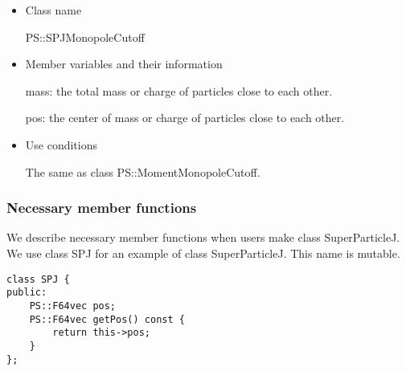 \begin{itemize}
\item Class name

  PS::SPJMonopoleCutoff

\item Member variables and their information

  mass: the total mass or charge of particles close to each other.

  pos: the center of mass or charge of particles close to each other.

\item Use conditions

  The same as class PS::MomentMonopoleCutoff.

\end{itemize}

\subsubsection{Necessary member functions}


We describe necessary member functions when users make class
SuperParticleJ. We use class SPJ for an example of class
SuperParticleJ. This name is mutable.


\begin{screen}
\begin{verbatim}
class SPJ {
public:
    PS::F64vec pos;
    PS::F64vec getPos() const {
        return this->pos;
    }
};
\end{verbatim}
\end{screen}

